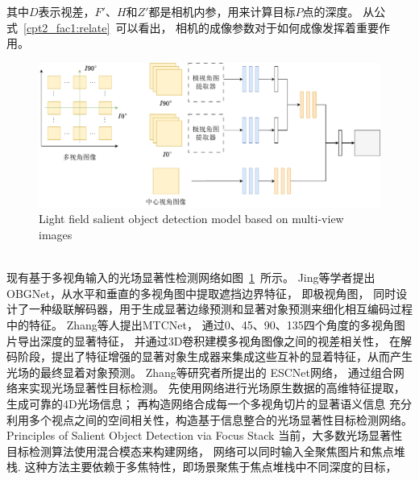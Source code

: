 %
%
其中$D$表示视差，$F'$、$H$和$Z'$都是相机内参，用来计算目标$P$点的深度。
从公式~\ref{cpt2_fac1:relate}~可以看出，
相机的成像参数对于如何成像发挥着重要作用。
\begin{figure}[t]
	\centering
	\includegraphics[width=1\linewidth]{figures/chapter2/multi_images_fssod}
	{Light field salient object detection model based on multi-view images}  
	\label{chpt2:figure:model_of_multi_inputs}
\end{figure}
\\
%
%
%
%
\indent
现有基于多视角输入的光场显著性检测网络如图~\ref{chpt2:figure:model_of_multi_inputs}~所示。
Jing等学者提出OBGNet，从水平和垂直的多视角图中提取遮挡边界特征，
即极视角图，
同时设计了一种级联解码器，用于生成显著边缘预测和显著对象预测来细化相互编码过程中的特征。
Zhang等人提出MTCNet，
通过0、45、90、135四个角度的多视角图片导出深度的显著特征，
并通过3D卷积建模多视角图像之间的视差相关性，
在解码阶段，提出了特征增强的显著对象生成器来集成这些互补的显着特征，从而产生光场的最终显着对象预测。
Zhang等研究者所提出的 ESCNet网络，
通过组合网络来实现光场显著性目标检测。
先使用网络进行光场原生数据的高维特征提取，生成可靠的4D光场信息；
再构造网络合成每一个多视角切片的显著语义信息
充分利用多个视点之间的空间相关性，构造基于信息整合的光场显著性目标检测网络。
{Principles of Salient Object Detection via Focus Stack}
当前，大多数光场显著性目标检测算法使用混合模态来构建网络，
网络可以同时输入全聚焦图片和焦点堆栈.
这种方法主要依赖于多焦特性，即场景聚焦于焦点堆栈中不同深度的目标，
